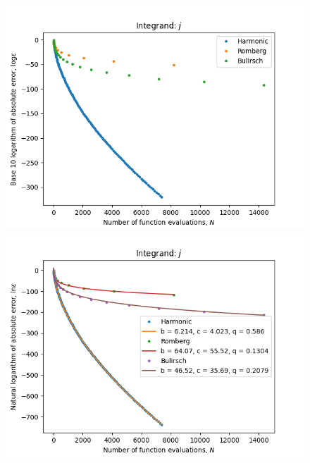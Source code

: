 \begin{figure}[H]
\centering
\begin{minipage}{0.45\textwidth}
\centering
\includegraphics[scale=0.45]{romberg_plots/gaussian_hp.png}
\end{minipage}
\begin{minipage}{0.45\textwidth}
\centering
\includegraphics[scale=0.45]{romberg_plots/gaussian_hp_trend.png}
\end{minipage}
\end{figure}

